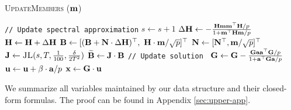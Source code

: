 \begin{algorithm}[!htbp]
\caption{\textsc{UpdateMembers} ($\mathbf{m}$)}
\label{algo:update-member}
\begin{algorithmic}[1]
\Statex  \texttt{// Update spectral approximation}
\State $s \leftarrow s + 1$ 
\State $\Delta \mathbf{H} \leftarrow - \frac{\mathbf{H} \mathbf{m} \mathbf{m}^{\top} \mathbf{H} / p}{1 + \mathbf{m}^{\top} \mathbf{H} \mathbf{m} / p}$  \label{line:Delta_H} 
\State $\mathbf{H} \leftarrow \mathbf{H} +\Delta \mathbf{H}$ 
\State $\mathbf{B}\leftarrow [ ( \mathbf{B} + \mathbf{N} \cdot \Delta \mathbf{H} )^{\top}, ~ \mathbf{H} \cdot \mathbf{m} / \sqrt{p}]^{\top}$\label{line:update-B} 
\State $\mathbf{N} \leftarrow [\mathbf{N}^{\top}, \mathbf{m} / \sqrt{p}]^{\top}$ \label{line:update-N} 
\State $\mathbf{J} \leftarrow \textsc{JL}(s, T, \frac{1}{100}, \frac{\delta}{2 T^2})$ \label{line:new-JL}
\State $\widetilde{\mathbf{B}}\leftarrow \mathbf{J} \cdot \mathbf{B}$\label{line:update-wt_B} 
\Statex  \texttt{// Update solution }
\State $\mathbf{G} \leftarrow \mathbf{G} - \frac{\mathbf{G} \mathbf{a} \mathbf{a}^{\top} \mathbf{G} / p}{1 + \mathbf{a}^{\top} \mathbf{G} \mathbf{a} / p}$ \label{line:update-G}
\State $\mathbf{u} \leftarrow \mathbf{u} + \beta \cdot \mathbf{a}/ p$\label{line:update-u}
\State $\mathbf{x} \leftarrow \mathbf{G}\cdot \mathbf{u}$  \label{line:update-x}
\end{algorithmic}
\end{algorithm}







We summarize all variables maintained by our data structure and their closed-form formulas. The proof can be found in Appendix \ref{sec:upper-app}.

